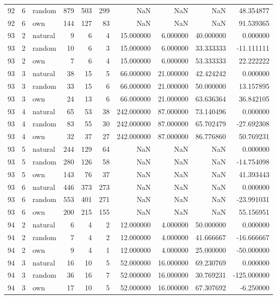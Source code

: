 \begin{table}[htbp]
\begin{tabular}{rrlrrrrrrr}
92 & 6 & random & 879 & 503 & 299 & NaN & NaN & NaN & 48.354877 \\
92 & 6 & own & 144 & 127 & 83 & NaN & NaN & NaN & 91.539365 \\
93 & 2 & natural & 9 & 6 & 4 & 15.000000 & 6.000000 & 40.000000 & 0.000000 \\
93 & 2 & random & 10 & 6 & 3 & 15.000000 & 6.000000 & 33.333333 & -11.111111 \\
93 & 2 & own & 7 & 6 & 4 & 15.000000 & 6.000000 & 53.333333 & 22.222222 \\
93 & 3 & natural & 38 & 15 & 5 & 66.000000 & 21.000000 & 42.424242 & 0.000000 \\
93 & 3 & random & 33 & 15 & 6 & 66.000000 & 21.000000 & 50.000000 & 13.157895 \\
93 & 3 & own & 24 & 13 & 6 & 66.000000 & 21.000000 & 63.636364 & 36.842105 \\
93 & 4 & natural & 65 & 53 & 38 & 242.000000 & 87.000000 & 73.140496 & 0.000000 \\
93 & 4 & random & 83 & 55 & 30 & 242.000000 & 87.000000 & 65.702479 & -27.692308 \\
93 & 4 & own & 32 & 37 & 27 & 242.000000 & 87.000000 & 86.776860 & 50.769231 \\
93 & 5 & natural & 244 & 129 & 64 & NaN & NaN & NaN & 0.000000 \\
93 & 5 & random & 280 & 126 & 58 & NaN & NaN & NaN & -14.754098 \\
93 & 5 & own & 143 & 76 & 37 & NaN & NaN & NaN & 41.393443 \\
93 & 6 & natural & 446 & 373 & 273 & NaN & NaN & NaN & 0.000000 \\
93 & 6 & random & 553 & 401 & 271 & NaN & NaN & NaN & -23.991031 \\
93 & 6 & own & 200 & 215 & 155 & NaN & NaN & NaN & 55.156951 \\
94 & 2 & natural & 6 & 4 & 2 & 12.000000 & 4.000000 & 50.000000 & 0.000000 \\
94 & 2 & random & 7 & 4 & 2 & 12.000000 & 4.000000 & 41.666667 & -16.666667 \\
94 & 2 & own & 9 & 4 & 1 & 12.000000 & 4.000000 & 25.000000 & -50.000000 \\
94 & 3 & natural & 16 & 10 & 5 & 52.000000 & 16.000000 & 69.230769 & 0.000000 \\
94 & 3 & random & 36 & 16 & 7 & 52.000000 & 16.000000 & 30.769231 & -125.000000 \\
94 & 3 & own & 17 & 10 & 5 & 52.000000 & 16.000000 & 67.307692 & -6.250000 \\

\end{tabular}
\end{table}
